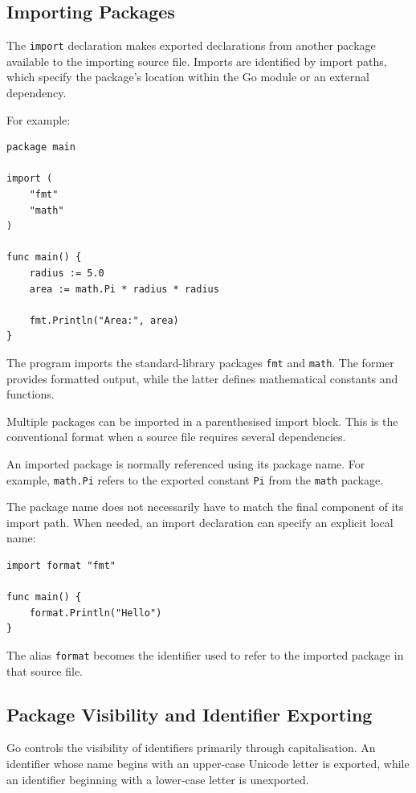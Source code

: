 \subsection{Importing Packages}

The \texttt{import} declaration makes exported declarations from another package available to the importing source file. Imports are identified by import paths, which specify the package's location within the Go module or an external dependency.

For example:

\begin{lstlisting}
package main

import (
    "fmt"
    "math"
)

func main() {
    radius := 5.0
    area := math.Pi * radius * radius

    fmt.Println("Area:", area)
}
\end{lstlisting}

The program imports the standard-library packages \texttt{fmt} and \texttt{math}. The former provides formatted output, while the latter defines mathematical constants and functions.

Multiple packages can be imported in a parenthesised import block. This is the conventional format when a source file requires several dependencies.

An imported package is normally referenced using its package name. For example, \texttt{math.Pi} refers to the exported constant \texttt{Pi} from the \texttt{math} package.

The package name does not necessarily have to match the final component of its import path. When needed, an import declaration can specify an explicit local name:

\begin{lstlisting}
import format "fmt"

func main() {
    format.Println("Hello")
}
\end{lstlisting}

The alias \texttt{format} becomes the identifier used to refer to the imported package in that source file.

\subsection{Package Visibility and Identifier Exporting}

Go controls the visibility of identifiers primarily through capitalisation. An identifier whose name begins with an upper-case Unicode letter is exported, while an identifier beginning with a lower-case letter is unexported.

